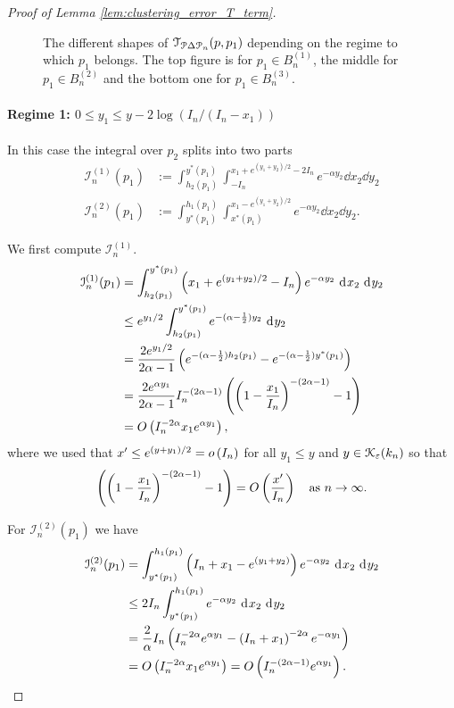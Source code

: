 \begin{proof}[Proof of Lemma \ref{lem:clustering_error_T_term}]
\begin{figure}[!tp]
\begin{tikzpicture}[scale=5]
\end{tikzpicture}
\caption{The different shapes of $\mathcal{T}_{\Pcal \Delta \Pcal_n}(p,p_1)$ depending on the regime to which $p_1$ belongs. The top figure is for $p_1 \in B_n^{(1)}$, the middle for $p_1 \in B_n^{(2)}$ and the bottom one for $p_1 \in B_n^{(3)}$.}
\label{fig:shapes_triangle_mismatches}
\end{figure}

\paragraph{Regime 1: $0 \le y_1 \le y - 2\log(I_n/(I_n-x_1))$}

In this case the integral over $p_2$ splits into two parts
\begin{align*}
	\mathcal{I}_n^{(1)}(p_1) &:= \int_{h_2(p_1)}^{y^\ast(p_1)} \int_{-I_n}^{x_1 + e^{(y_1+y_2)/2}-2I_n} e^{-\alpha y_2}
		\dd x_2 \dd y_2\\
	\mathcal{I}_n^{(2)}(p_1) &:= \int_{y^\ast(p_1)}^{h_1(p_1)} \int_{x^\ast(p_1)}^{x_1 - e^{(y_1+y_2)/2}} e^{-\alpha y_2}
		\dd x_2 \dd y_2.
\end{align*}

We first compute $\mathcal{I}_n^{(1)}$.
\begin{align*}
	\mathcal{I}_n^{(1)}(p_1) &= \int_{h_2(p_1)}^{y^\ast(p_1)} \left(x_1 + e^{(y_1+y_2)/2} - I_n\right) e^{-\alpha y_2} 
		\dd x_2 \dd y_2\\
	&\le e^{y_1/2} \int_{h_2(p_1)}^{y^\ast(p_1)} e^{-(\alpha-\frac{1}{2}) y_2} \dd y_2\\
	&= \frac{2 e^{y_1/2}}{2\alpha - 1} \left(e^{-(\alpha-\frac{1}{2})h_2(p_1)} - e^{-(\alpha-\frac{1}{2})y^\ast(p_1)}
		\right) \\
	&= \frac{2 e^{\alpha y_1}}{2\alpha - 1} I_n^{-(2\alpha -1)}\left(\left(1 - \frac{x_1}{I_n}\right)^{-(2\alpha - 1)}-1\right)\\
	&= \bigO{I_n^{-2\alpha} x_1 e^{\alpha y_1}},
\end{align*}
where we used that $x^\prime \le e^{(y+y_1)/2} = \smallO{I_n}$ for all $y_1\le y$ and $y \in \Kcal_{\varepsilon}(k_n)$ so that
\[
	\left(\left(1 - \frac{x_1}{I_n}\right)^{-(2\alpha - 1)}-1\right) = \bigO{\frac{x^\prime}{I_n}} \quad 
	\text{as } n \to \infty.
\]

For $\mathcal{I}_n^{(2)}(p_1)$ we have
\begin{align*}
	\mathcal{I}_n^{(2)}(p_1) &= \int_{y^\ast(p_1)}^{h_1(p_1)} \left(I_n + x_1 - e^{(y_1+y_2)}\right) e^{-\alpha y_2}
		\dd x_2 \dd y_2\\
	&\le 2 I_n \int_{y^\ast(p_1)}^{h_1(p_1)} e^{-\alpha y_2} \dd x_2 \dd y_2\\
	&= \frac{2}{\alpha} I_n \left(I_n^{-2\alpha}e^{\alpha y_1} - \left(I_n + x_1\right)^{-2\alpha} e^{-\alpha y_1}\right)\\
	&= \bigO{I_n^{-2\alpha} x_1 e^{\alpha y_1}} = \bigO{I_n^{-(2\alpha - 1)} e^{\alpha y_1}}.
\end{align*}


\end{proof}
